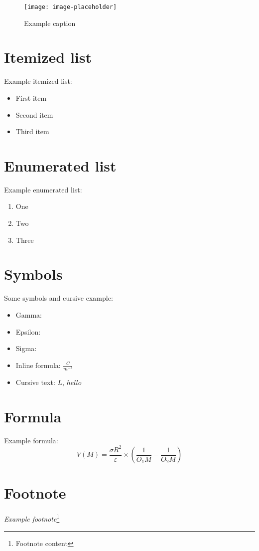 \begin{figure}[H]
  \centering
  \texttt{[image: image-placeholder]}
  \caption{Example caption}
  \label{fig:example-reference}
\end{figure}

\section{Itemized list}
\noindent
Example itemized list:

\begin{itemize}
  \item First item
  \item Second item
  \item Third item
\end{itemize}

\section{Enumerated list}
\noindent
Example enumerated list:

\begin{enumerate}
  \item One
  \item Two
  \item Three
\end{enumerate}

\section{Symbols}
\noindent
Some symbols and cursive example:

\begin{itemize}
  \item Gamma: \textgamma
  \item Epsilon: \textepsilon
  \item Sigma: \textsigma
  \item Inline formula: $\frac{C}{m^{-3}}$
  \item Cursive text: $L$, $hello$
\end{itemize}

\section{Formula}
\noindent
Example formula:
\[V(M) = \frac{\sigma R^2}{\varepsilon} \times (\frac{1}{O_{1}M} - \frac{1}{O_{2}M})\]

\section{Footnote}
\noindent
\emph{Example footnote}\footnote{Footnote content}

